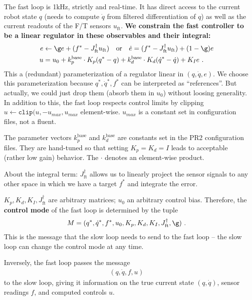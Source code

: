\documentclass[10pt,fleqn,twoside]{article}
\newcommand{\ft}{\text{ft}}
\begin{document}
{{The fast loop is 1kHz, strictly and real-time. It has direct access to
the current robot state $q$ (needs to compute $\dot q$ from filtered
differentiation of $q$) as well as the current readouts of the F/T
sensors $u_\ft$. \textbf{We constrain the fast controller to be a linear
regulator in these observables and their integral:}
\begin{align}
e
&\gets \g e + (f^* - J_\ft^\dag u_\ft)
  \quad\text{or}\quad \dot e = (f^*-J_\ft^\dag u_\ft) + (1-\g)e\\
u
&= u_0 + k_p^\text{base} \cdot K_p (q^* - q) + k_d^\text{base} \cdot K_d (\dot q^* - \dot q) + K_I e ~.
\end{align}
This a (redundant) parameterization of a regulator linear in $(q, \dot
q, e)$. We choose this parameterization because $q^*, \dot q^*, f^*$
can be interpreted as ``references''. But actually, we could just drop
them (absorb them in $u_0$) without loosing generality. In addition to
this, the fast loop respects control limits by clipping
$u \gets \texttt{clip}(u, -u_{max}, u_{max}$ element-wise. $u_{max}$
is a constant set in configuration files, not a
fluent. 

The parameter vectors $k_p^\text{base}$ and $k_d^\text{base}$ are
constants set in the PR2 configuration files. They are hand-tuned so
that setting $K_p=K_d=I$ leads to acceptable (rather low gain)
behavior. The $\cdot$ denotes an element-wise product.

About the integral term: $J_\ft^\dag$ allows us to linearly project the
sensor signals to any other space in which we have a target $f^*$ and
integrate the error.

$K_p, K_d, K_I, J_\ft^\dag$ are arbitrary matrices; $u_0$ an arbitrary
control bias. Therefore, the \textbf{control mode} of the fast loop is
determined by the tuple
\begin{align}
M = (q^*, \dot q^*, f^*, u_0, K_p, K_d, K_I, J_\ft^\dag, \g) ~.
\end{align}
This is the message that the slow loop needs to send to the fast loop
-- the slow loop can change the control mode at any time.

Inversely, the fast loop passes the message
\begin{align}
(q, \dot q, f, u)
\end{align}
to the slow loop, giving it information on the true current state
 $(q, \dot q)$, sensor readings $f$, and computed controls $u$.

}}
\end{document}
